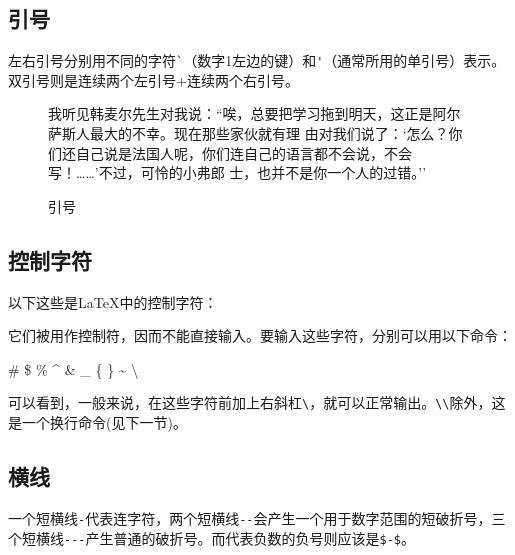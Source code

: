 \subsection{引号}
左右引号分别用不同的字符\verb|`|（数字1左边的键）和\verb|'|（通常所用的单引号）表示。双引号则是连续两个左引号+连续两个右引号。
\begin{figure}[h]
\centering
{}
\hspace{0.1\textwidth}
\begin{minipage}[h]{0.4\textwidth}
\centering
\begin{code}
我听见韩麦尔先生对我说：``唉，总要把学习拖到明天，这正是阿尔萨斯人最大的不幸。现在那些家伙就有理 由对我们说了：`怎么？你们还自己说是法国人呢，你们连自己的语言都不会说，不会写！……'不过，可怜的小弗郎 士，也并不是你一个人的过错。''
\end{code}
\end{minipage}
\caption{引号}
\label{f:quote}
\end{figure}

\subsection{控制字符}
以下这些是\LaTeX 中的控制字符：
\begin{code}
              #  $  %
\end{code}
它们被用作控制符，因而不能直接输入。要输入这些字符，分别可以用以下命令：
\begin{code}
        \#   \$  \%   \^{}  \&  \_  \{  \}  \~{}  \textbackslash
\end{code}
可以看到，一般来说，在这些字符前加上右斜杠\verb|\|，就可以正常输出。\verb|\\|除外，这是一个换行命令(见下一节)。\par

\subsection{横线}
一个短横线\verb|-|代表连字符，两个短横线\verb|--|会产生一个用于数字范围的短破折号，三个短横线\verb|---|产生普通的破折号。而代表负数的负号则应该是\verb|$-$|。

